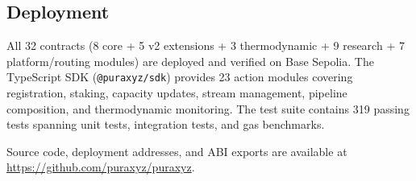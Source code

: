 \subsection{Deployment}

All 32 contracts (8 core + 5 v2 extensions + 3 thermodynamic + 9 research + 7 platform/routing modules)
are deployed and verified on Base Sepolia. The TypeScript SDK (\texttt{@puraxyz/sdk})
provides 23 action modules covering registration, staking, capacity updates, stream
management, pipeline composition, and thermodynamic monitoring. The test suite
contains 319 passing tests spanning unit tests, integration tests, and gas benchmarks.

Source code, deployment addresses, and ABI exports are available at
\url{https://github.com/puraxyz/puraxyz}.
